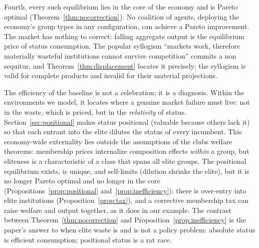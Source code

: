 \documentclass[12pt,letterpaper]{article}
\theoremstyle{definition}
\begin{document}
Fourth, every such equilibrium lies in the core of the economy and is Pareto optimal (Theorem~\ref{thm:nocorrection}).
No coalition of agents, deploying the economy's group types in any configuration, can achieve a Pareto improvement.
The market has nothing to correct: falling aggregate output is the equilibrium price of status consumption.
The popular syllogism ``markets work, therefore materially wasteful institutions cannot survive competition'' commits a non sequitur, and Theorem~\ref{thm:displacement} locates it precisely: the syllogism is valid for complete products and invalid for their material projections.

The efficiency of the baseline is not a celebration; it is a diagnosis.
Within the environments we model, it locates where a genuine market failure must live: not in the waste, which is priced, but in the \emph{relativity} of status.
Section~\ref{sec:positional} makes status positional (valuable because others lack it) so that each entrant into the elite dilutes the status of every incumbent.
This economy-wide externality lies outside the assumptions of the clubs welfare theorems: membership prices internalize composition effects \emph{within} a group, but eliteness is a characteristic of a class that spans all elite groups.
The positional equilibrium exists, is unique, and self-limits (dilution shrinks the elite), but it is no longer Pareto optimal and no longer in the core (Propositions~\ref{prop:positional} and~\ref{prop:inefficiency}): there is over-entry into elite institutions (Proposition~\ref{prop:tax}), and a corrective membership tax can raise welfare and output together, as it does in our example.
The contrast between Theorem~\ref{thm:nocorrection} and Proposition~\ref{prop:inefficiency} is the paper's answer to when elite waste is and is not a policy problem: absolute status is efficient consumption; positional status is a rat race.
\end{document}
